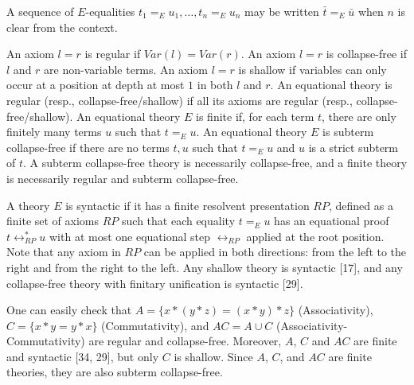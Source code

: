  
 
A sequence of $E$-equalities $t_{1}=_{E}u_{1},\dots,t_{n}=_{E}u_{n}$ may be written $\bar{t}=_{E}\bar{u}$ when $n$ is clear from the context.\par
 
 
 
An axiom $l=r$ is regular if $\mathit{Var}(l)=\mathit{Var}(r)$. An axiom $l=r$ is collapse-free if $l$ and $r$ are non-variable terms. An axiom $l=r$ is shallow if variables can only occur at a position at depth at most $1$ in both $l$ and $r$. An equational theory is regular (resp., collapse-free/shallow) if all its axioms are regular (resp., collapse-free/shallow). An equational theory $E$ is finite if, for each term $t$, there are only finitely many terms $u$ such that $t=_{E}u$. An equational theory $E$ is subterm collapse-free if there are no terms $t,u$ such that $t=_{E}u$ and $u$ is a strict subterm of $t$. A subterm collapse-free theory is necessarily collapse-free, and a finite theory is necessarily regular and subterm collapse-free.\par
 
 
 
A theory $E$ is syntactic if it has a finite resolvent presentation $RP$, defined as a finite set of axioms $RP$ such that each equality $t=_{E}u$ has an equational proof $t\leftrightarrow_{RP}^{*}u$ with at most one equational step $\leftrightarrow_{RP}$ applied at the root position. Note that any axiom in $RP$ can be applied in both directions: from the left to the right and from the right to the left. Any shallow theory is syntactic [17], and any collapse-free theory with finitary unification is syntactic [29].\par
 
 
 
One can easily check that $A=\{x*(y*z)=(x*y)*z\}$ (Associativity), $C=\{x*y=y*x\}$ (Commutativity), and $AC=A\cup C$ (Associativity-Commutativity) are regular and collapse-free. Moreover, $A$, $C$ and $AC$ are finite and syntactic [34, 29], but only $C$ is shallow. Since $A$, $C$, and $AC$ are finite theories, they are also subterm collapse-free.\par
 
 
